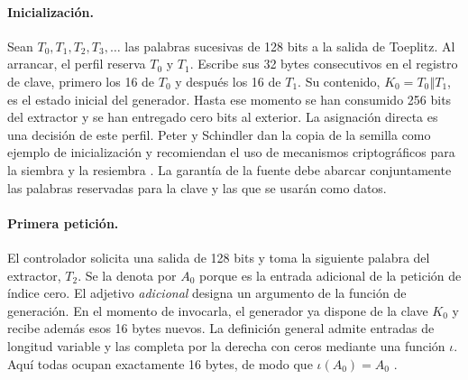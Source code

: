 \documentclass[11pt,a4paper]{article}
\newcommand{\cat}{\mathbin\Vert}
\begin{document}
\paragraph{Inicialización.}
Sean \(T_0,T_1,T_2,T_3,\ldots\) las palabras sucesivas de 128 bits a la salida de Toeplitz. Al arrancar, el perfil reserva \(T_0\) y \(T_1\). Escribe sus 32 bytes consecutivos en el registro de clave, primero los 16 de \(T_0\) y después los 16 de \(T_1\). Su contenido, \(K_0=T_0\cat T_1\), es el estado inicial del generador. Hasta ese momento se han consumido 256 bits del extractor y se han entregado cero bits al exterior. La asignación directa es una decisión de este perfil. Peter y Schindler dan la copia de la semilla como ejemplo de inicialización y recomiendan el uso de mecanismos criptográficos para la siembra y la resiembra \cite[párrs.~145--146, p.~25]{ais}. La garantía de la fuente debe abarcar conjuntamente las palabras reservadas para la clave y las que se usarán como datos.

\paragraph{Primera petición.}
El controlador solicita una salida de 128 bits y toma la siguiente palabra del extractor, \(T_2\). Se la denota por \(A_0\) porque es la entrada adicional de la petición de índice cero. El adjetivo \emph{adicional} designa un argumento de la función de generación. En el momento de invocarla, el generador ya dispone de la clave \(K_0\) y recibe además esos 16 bytes nuevos. La definición general admite entradas de longitud variable y las completa por la derecha con ceros mediante una función \(\iota\). Aquí todas ocupan exactamente 16 bytes, de modo que \(\iota(A_0)=A_0\) \cite[párr.~996, p.~203]{ais}.
\end{document}
